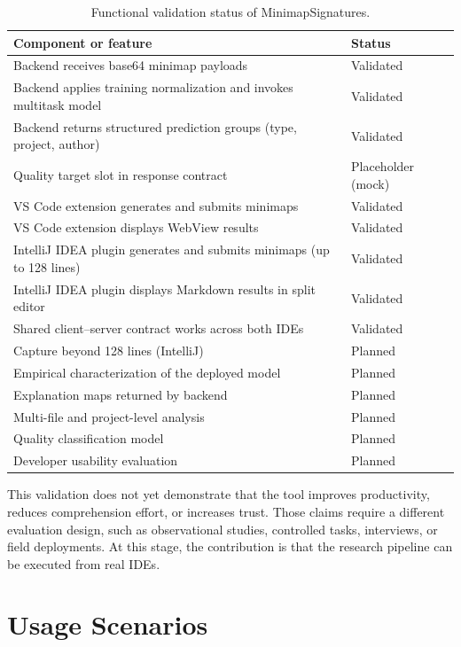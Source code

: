 \begin{table}[ht]
\centering
\caption{Functional validation status of MinimapSignatures.}
\label{tab:functional-validation}
\begin{tabular}{p{}p{}}
\toprule
\textbf{Component or feature} & \textbf{Status} \\
\midrule
Backend receives base64 minimap payloads & Validated \\
Backend applies training normalization and invokes multitask model & Validated \\
Backend returns structured prediction groups (type, project, author) & Validated \\
Quality target slot in response contract & Placeholder (mock) \\
VS Code extension generates and submits minimaps & Validated \\
VS Code extension displays WebView results & Validated \\
IntelliJ IDEA plugin generates and submits minimaps (up to 128 lines) & Validated \\
IntelliJ IDEA plugin displays Markdown results in split editor & Validated \\
Shared client--server contract works across both IDEs & Validated \\
Capture beyond 128 lines (IntelliJ) & Planned \\
Empirical characterization of the deployed model & Planned \\
Explanation maps returned by backend & Planned \\
Multi-file and project-level analysis & Planned \\
Quality classification model & Planned \\
Developer usability evaluation & Planned \\
\bottomrule
\end{tabular}
\fautor
\end{table}

This validation does not yet demonstrate that the tool improves productivity,
reduces comprehension effort, or increases trust. Those claims require a
different evaluation design, such as observational studies, controlled tasks,
interviews, or field deployments. At this stage, the contribution is that the
research pipeline can be executed from real IDEs.

\section{Usage Scenarios}


